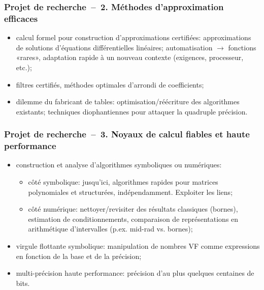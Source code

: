 \documentclass[mathsans]{beamer}
\begin{document}
\begin{frame}
\frametitle{Projet de recherche~--~2. Méthodes d'approximation efficaces}
           \begin{itemize}
                 \item \alert{calcul formel pour construction d'approximations certifiées:} approximations de solutions d'équations différentielles linéaires; automatisation $\to$ fonctions «rares», adaptation rapide à un nouveau contexte (exigences, processeur, etc.);
                 \item \alert{filtres certifiés,} méthodes optimales d'arrondi de coefficients;
                 \item \alert{dilemme du fabricant de tables:} optimisation/réécriture des algorithmes existants; techniques diophantiennes pour attaquer la quadruple précision.
           \end{itemize}
\end{frame}

\begin{frame}
\frametitle{Projet de recherche~--~3. Noyaux de calcul fiables et haute performance}
\begin{itemize}
     \item \alert{construction et analyse d'algorithmes symboliques ou numériques:}
         \begin{itemize}
             \item côté symbolique: jusqu'ici, algorithmes rapides pour matrices polynomiales et structurées, indépendamment. Exploiter les liens;
             \item côté numérique: nettoyer/revisiter des résultats classiques (bornes), estimation de conditionnements, comparaison de représentations en arithmétique d'intervalles (p.ex. mid-rad vs. bornes);
          \end{itemize}
     \item \alert{virgule flottante symbolique:} manipulation de nombres VF comme expressions en fonction de la base et de la précision;
     \item \alert{multi-précision haute performance:} précision d'au plus quelques centaines de bits.
\end{itemize}
\end{frame}
\end{document}
